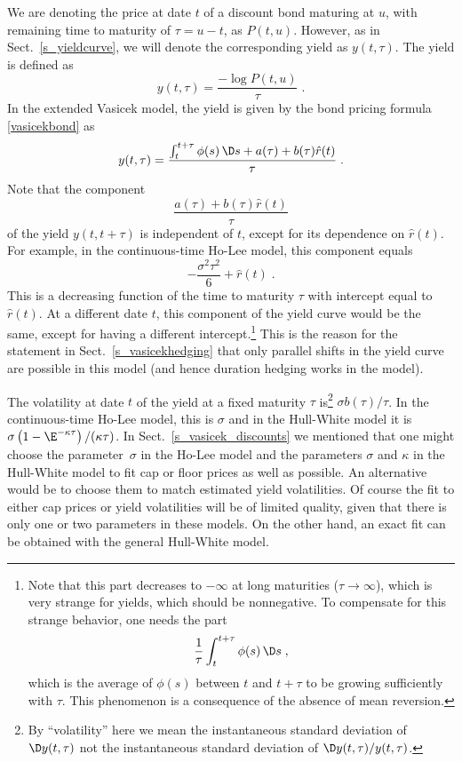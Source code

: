 We are denoting the price at date $t$ of a discount bond maturing at $u$, with remaining time to maturity of $\tau = u-t$, as $P(t,u)$.  However, as in Sect.~\ref{s_yieldcurve}, we will denote the corresponding yield as $y(t,\tau)$.  The yield is defined as 
$$y(t,\tau) = \frac{-\log P(t,u)}{\tau}\; .$$
In the extended Vasicek model, the yield is given by the bond pricing formula \eqref{vasicekbond} as
$$y(t,\tau) = \frac{\int_t^{t+\tau} \phi(s)\,\D s + a(\tau) + b(\tau)\hat{r}(t)}{\tau}\; .$$
Note that the component
$$\frac{a(\tau) + b(\tau)\hat{r}(t)}{\tau}$$
of the yield $y(t,t+\tau)$ is independent of $t$, except for its dependence on $\hat{r}(t)$.  For example, in the continuous-time Ho-Lee model, this component equals
$$-\frac{\sigma^2\tau^2}{6} + \hat{r}(t)\; .$$
This is a decreasing function of the time to maturity $\tau$ with intercept equal to $\hat{r}(t)$.  At a different date $t$, this component of the yield curve would be the same, except for having a different intercept.\footnote{Note that this part decreases to $-\infty$ at long maturities ($\tau \rightarrow \infty$), which is very strange for yields, which should be nonnegative.  To compensate for this strange behavior, one needs the part $$\frac{1}{\tau}\int_t^{t+\tau} \phi(s)\,\D s\; ,$$
which is the average of $\phi(s)$ between $t$ and $t+\tau$ to be growing sufficiently with $\tau$.  This phenomenon is a consequence of the absence of mean reversion.}  This is the reason for the statement in Sect.~\ref{s_vasicekhedging} that only parallel shifts in the yield curve are possible in this model (and hence duration hedging works in the model).

The volatility at date $t$ of the yield at a fixed maturity $\tau$ is\footnote{By ``volatility'' here we mean the instantaneous standard deviation of $\D y(t,\tau)$ not the instantaneous standard deviation of $\D y(t,\tau)/y(t,\tau)$.} $\sigma b(\tau)/\tau$.
In the continuous-time Ho-Lee model, this is $\sigma$ and in the  Hull-White model it is $\sigma\left(1-\E^{-\kappa\tau}\right)/(\kappa\tau)$.  In Sect.~\ref{s_vasicek_discounts} we mentioned that one might choose the parameter~$\sigma$ in the Ho-Lee model and the parameters $\sigma$ and $\kappa$ in the  Hull-White model to fit cap or floor prices as well as possible.  An alternative would be to choose them to match estimated yield volatilities.  Of course the fit to either cap prices or yield volatilities will be of limited quality, given that there is only one or two parameters in these models.  On the other hand, an exact fit can be obtained with the general Hull-White model.



